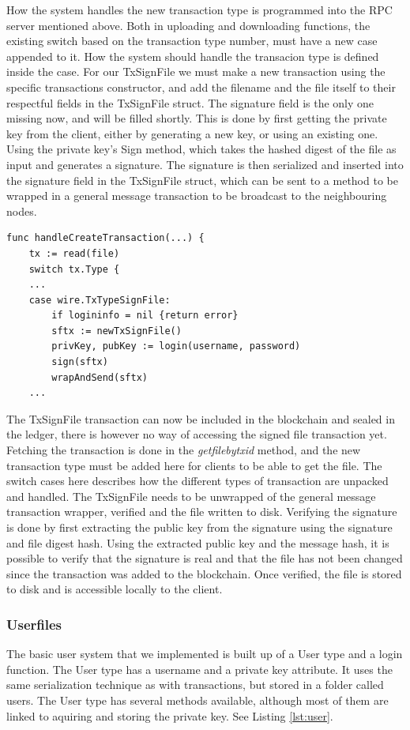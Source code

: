 \documentclass[12pt]{article}
\begin{document}
How the system handles the new transaction type is programmed into the RPC server mentioned above. Both in uploading and downloading functions, the existing switch based on the transaction type number, must have a new case appended to it. How the system should handle the transacion type is defined inside the case. For our TxSignFile we must make a new transaction using the specific transactions constructor, and add the filename and the file itself to their respectful fields in the TxSignFile struct. The signature field is the only one missing now, and will be filled shortly. This is done by first getting the private key from the client, either by generating a new key, or using an existing one. Using the private key's Sign method, which takes the hashed digest of the file as input and generates a signature. The signature is then serialized and inserted into the signature field in the TxSignFile struct, which can be sent to a method to be wrapped in a general message transaction to be broadcast to the neighbouring nodes. 
\begin{lstlisting}[float=h!,caption={Pseudo code of the signed file case in createtransaction},label=lst:crtx]
func handleCreateTransaction(...) {
	tx := read(file)
	switch tx.Type {
	...
	case wire.TxTypeSignFile:
		if logininfo = nil {return error}
		sftx := newTxSignFile()
		privKey, pubKey := login(username, password)
		sign(sftx)
		wrapAndSend(sftx)
	...

\end{lstlisting}
The TxSignFile transaction can now be included in the blockchain and sealed in the ledger, there is however no way of accessing the signed file transaction yet. Fetching the transaction is done in the \textit{getfilebytxid} method, and the new transaction type must be added here for clients to be able to get the file. The switch cases here describes how the different types of transaction are unpacked and handled. The TxSignFile needs to be unwrapped of the general message transaction wrapper, verified and the file written to disk. Verifying the signature is done by first extracting the public key from the signature using the signature and file digest hash. Using the extracted public key and the message hash, it is possible to verify that the signature is real and that the file has not been changed since the transaction was added to the blockchain. Once verified, the file is stored to disk and is accessible locally to the client. 

\subsubsection{Userfiles}\label{subsec:userfiles}
The basic user system that we implemented is built up of a User type and a login function. The User type has a username and a private key attribute. It uses the same serialization technique as with transactions, but stored in a folder called users. The User type has several methods available, although most of them are linked to aquiring and storing the private key. See Listing \ref{lst:user}.
\end{document}
